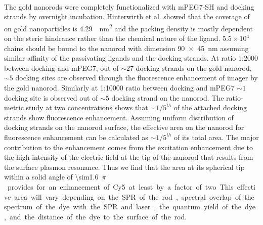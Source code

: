 \paragraph*{} The gold nanorods were completely functionalized with mPEG7-SH and docking strands by overnight incubation.
Hinterwirth et al. showed that the coverage of  on gold nanoparticles is \SI{4.29}{\per\nm\squared} and the packing density is mostly dependent on the steric hindrance rather than the chemical nature of the ligand.\cite{hinterwirth2013quantifying}
$5.5\times10^4$ chains should be bound to the nanorod with dimension \SI[product-units=repeat]{90x45}{\nm} assuming similar affinity of the passivating ligands and the docking strands.
At ratio 1:2000 between docking and mPEG7, out of ${\sim}27$ docking strands on the gold nanorod, ${\sim}5$ docking sites are observed through the fluorescence enhancement of imager by the gold nanorod.
Similarly at 1:10000 ratio between docking and mPEG7 ${\sim}1$ docking site is observed out of ${\sim}5$ docking strand on the nanorod.
The ratio-metric study at two concentrations shows that ${\sim}1/5^{th}$  of the attached docking strands show fluorescence enhancement.
Assuming uniform distribution of docking strands on the nanorod surface, the effective area on the nanorod for fluorescence enhancement can be calculated as ${\sim}1/5^{th}$ of its total area.
The major contribution to the enhancement comes from the excitation enhancement due to the high intensity of the electric field at the tip of the nanorod that results from the surface plasmon resonance.
Thus we find that the area at its spherical tip within a solid angle of \SI{\sim1.6}{$\pi$} provides for an enhancement of Cy5 at least by a factor of two.
This effective area will vary depending on the SPR of the rod, spectral overlap of the spectrum of the dye with the SPR and laser, the quantum yield of the dye, and the distance of the dye to the surface of the rod.


